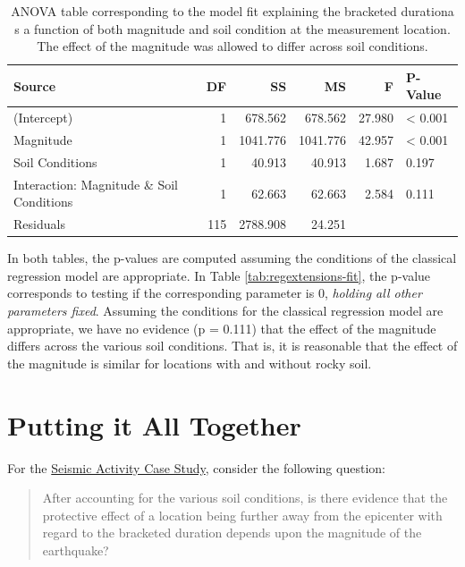 \documentclass[]{book}
\theoremstyle{plain}
\theoremstyle{mydefn}
\theoremstyle{myexmpl}
\theoremstyle{remark}
\begin{document}
\begin{table}

\caption{\label{tab:regextensions-anova}ANOVA table corresponding to the model fit explaining the bracketed durationa s a function of both magnitude and soil condition at the measurement location.  The effect of the magnitude was allowed to differ across soil conditions.}
\centering
\begin{tabular}[t]{l|r|r|r|r|l}
\hline
Source & DF & SS & MS & F & P-Value\\
\hline
(Intercept) & 1 & 678.562 & 678.562 & 27.980 & < 0.001\\
\hline
Magnitude & 1 & 1041.776 & 1041.776 & 42.957 & < 0.001\\
\hline
Soil Conditions & 1 & 40.913 & 40.913 & 1.687 & 0.197\\
\hline
Interaction: Magnitude \& Soil Conditions & 1 & 62.663 & 62.663 & 2.584 & 0.111\\
\hline
Residuals & 115 & 2788.908 & 24.251 &  & \\
\hline
\end{tabular}
\end{table}

In both tables, the p-values are computed assuming the conditions of the
classical regression model are appropriate. In Table
\ref{tab:regextensions-fit}, the p-value corresponds to testing if the
corresponding parameter is 0, \emph{holding all other parameters fixed}.
Assuming the conditions for the classical regression model are
appropriate, we have no evidence (p = 0.111) that the effect of the
magnitude differs across the various soil conditions. That is, it is
reasonable that the effect of the magnitude is similar for locations
with and without rocky soil.

\chapter{Putting it All Together}\label{Regrecap}

For the \protect\hyperlink{CaseGreece}{Seismic Activity Case Study},
consider the following question:

\begin{quote}
After accounting for the various soil conditions, is there evidence that
the protective effect of a location being further away from the
epicenter with regard to the bracketed duration depends upon the
magnitude of the earthquake?
\end{quote}
\end{document}
